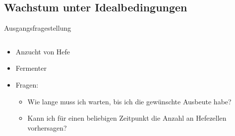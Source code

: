 \subsection{Wachstum unter Idealbedingungen}
\frame{\subtoc}
\begin{frame}{Ausgangsfragestellung}
  \begin{columns}
    \begin{column}{.6\textwidth}
      \begin{itemize}
      \item<+-> Anzucht von Hefe
      \item<+-> Fermenter
      \item<+-> Fragen:
        \begin{itemize}
        \item<+-> Wie lange muss ich warten, bis ich die gewünschte Ausbeute habe?
        \item<+-> Kann ich für einen beliebigen Zeitpunkt die Anzahl
          an Hefezellen vorhersagen?
        \end{itemize}
      \end{itemize}
    \end{column}
    \begin{column}{.39\textwidth}
      \begin{center}
      \end{center}
    \end{column}
  \end{columns}
\end{frame}

